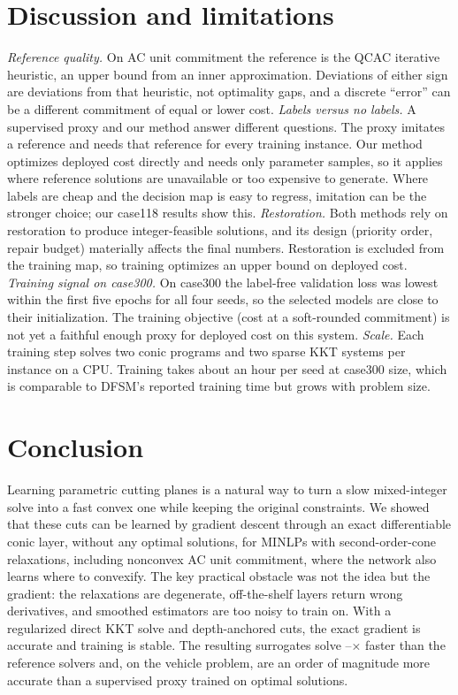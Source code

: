\documentclass[10pt]{article}
\begin{document}
\section{Discussion and limitations}
\label{sec:discussion}
\emph{Reference quality.} On AC unit commitment the reference is the QCAC iterative heuristic, an upper bound from an inner approximation. Deviations of either sign are deviations from that heuristic, not optimality gaps, and a discrete ``error'' can be a different commitment of equal or lower cost.
\emph{Labels versus no labels.} A supervised proxy and our method answer different questions. The proxy imitates a reference and needs that reference for every training instance. Our method optimizes deployed cost directly and needs only parameter samples, so it applies where reference solutions are unavailable or too expensive to generate. Where labels are cheap and the decision map is easy to regress, imitation can be the stronger choice; our case118 results show this.
\emph{Restoration.} Both methods rely on restoration to produce integer-feasible solutions, and its design (priority order, repair budget) materially affects the final numbers. Restoration is excluded from the training map, so training optimizes an upper bound on deployed cost.
\emph{Training signal on case300.} On case300 the label-free validation loss was lowest within the first five epochs for all four seeds, so the selected models are close to their initialization. The training objective (cost at a soft-rounded commitment) is not yet a faithful enough proxy for deployed cost on this system.
\emph{Scale.} Each training step solves two conic programs and two sparse KKT systems per instance on a CPU. Training takes about an hour per seed at case300 size, which is comparable to DFSM's reported training time but grows with problem size.

\section{Conclusion}
\label{sec:conclusion}
Learning parametric cutting planes is a natural way to turn a slow mixed-integer solve into a fast convex one while keeping the original constraints. We showed that these cuts can be learned by gradient descent through an exact differentiable conic layer, without any optimal solutions, for MINLPs with second-order-cone relaxations, including nonconvex AC unit commitment, where the network also learns where to convexify. The key practical obstacle was not the idea but the gradient: the relaxations are degenerate, off-the-shelf layers return wrong derivatives, and smoothed estimators are too noisy to train on. With a regularized direct KKT solve and depth-anchored cuts, the exact gradient is accurate and training is stable. The resulting surrogates solve \SPDA--\SPDV$\times$ faster than the reference solvers and, on the vehicle problem, are an order of magnitude more accurate than a supervised proxy trained on optimal solutions.
\end{document}
